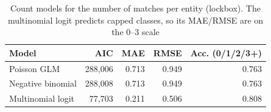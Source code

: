 \begin{table}[t]
\centering
\footnotesize
\caption{Count models for the number of matches per entity (lockbox). The multinomial logit predicts capped classes, so its MAE/RMSE are on the 0--3 scale}
\label{tab:counts}
\begin{tabular}{lrrrr}
\toprule
Model & AIC & MAE & RMSE & Acc. (0/1/2/3+) \\
\midrule
Poisson GLM & 288,006 & 0.713 & 0.949 & 0.763 \\
Negative binomial & 288,008 & 0.713 & 0.949 & 0.763 \\
Multinomial logit & 77,703 & 0.211 & 0.506 & 0.808 \\
\bottomrule
\end{tabular}
\end{table}
